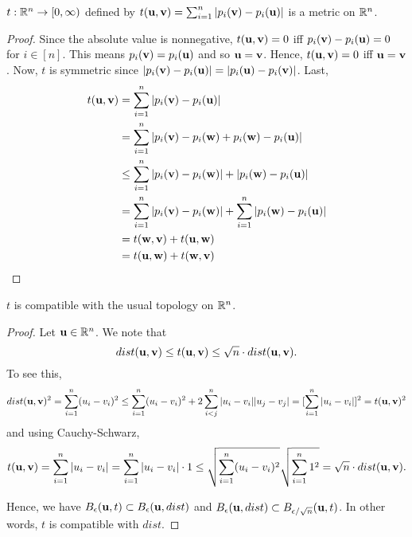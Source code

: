 \documentclass[letterpaper, twoside, 12pt]{book}
\begin{document}
\begin{example}
  \(t:\mathbb R^n\to[0,\infty)\) defined by
  \(t(\mathbf u,\mathbf v)=\sum_{i=1}^n |p_i(\mathbf v)-p_i(\mathbf u)|\)
  is a metric on \(\mathbb R^n\).
\end{example}

\begin{proof}
    Since the absolute value is nonnegative, \(t(\mathbf u, \mathbf v) = 0\) iff \(p_i(\mathbf v) - p_i(\mathbf u) = 0\)
    for \(i \in [n]\). This means \(p_i(\mathbf v) = p_i(\mathbf u)\) and so \(\mathbf u = \mathbf v\).
    Hence, \(t(\mathbf u, \mathbf v) = 0\) iff \(\mathbf u = \mathbf v\). Now, \(t\) is symmetric
    since \(|p_i(\mathbf v) - p_i(\mathbf u)| = |p_i(\mathbf u) - p_i(\mathbf v)|\). Last,
    \begin{align*}
        t(\mathbf u, \mathbf v) &= \sum_{i = 1}^n |p_i(\mathbf v) - p_i(\mathbf u)| \\
                            &= \sum_{i = 1}^n |p_i(\mathbf v) - p_i(\mathbf w) + p_i(\mathbf w) - p_i(\mathbf u)| \\
                            &\leq \sum_{i = 1}^n |p_i(\mathbf v) - p_i(\mathbf w)| + |p_i(\mathbf w) - p_i(\mathbf u)| \\
                            &= \sum_{i = 1}^n |p_i(\mathbf v) - p_i(\mathbf w)| + \sum_{i = 1}^n |p_i(\mathbf w) - p_i(\mathbf u)| \\
                            &= t(\mathbf w, \mathbf v) + t(\mathbf u, \mathbf w) \\
                            &= t(\mathbf u, \mathbf w) + t(\mathbf w, \mathbf v) \\
    \end{align*}
\end{proof}

\begin{theorem}
  \(t\) is compatible with the usual topology on \(\mathbb R^n\).
\end{theorem}

\begin{proof}
    Let \(\mathbf u \in \mathbb R^n\). We note that
    \[ dist(\mathbf u, \mathbf v) \leq t(\mathbf u, \mathbf v) \leq \sqrt{n} \cdot dist(\mathbf u, \mathbf v) .\]
    To see this,
    \[ dist(\mathbf u, \mathbf v)^2 = \sum_{i = 1}^n (u_i - v_i)^2 \leq 
        \sum_{i = 1}^n (u_i - v_i)^2 + 2 \sum_{i < j}^n |u_i - v_i||u_j - v_j| = 
        [\sum_{i = 1}^n |u_i - v_i|]^2 = t(\mathbf u, \mathbf v)^2  \]
    and using Cauchy-Schwarz, 
    \[ t(\mathbf u, \mathbf v) = \sum_{i = 1}^n |u_i - v_i| = \sum_{i = 1}^n |u_i - v_i| \cdot 1 
    \leq \sqrt{ \sum_{i = 1}^n (u_i - v_i)^2} \sqrt{\sum_{i = 1}^n 1^2} = \sqrt{n} \cdot dist(\mathbf u, \mathbf v). \]

    Hence, we have \(B_{\epsilon}(\mathbf u, t) \subset B_{\epsilon}(\mathbf u, dist)\) and
    \(B_{\epsilon}(\mathbf u, dist) \subset B_{\epsilon / \sqrt{n}}(\mathbf u, t)\). In other
    words, \(t\) is compatible with \(dist\).
\end{proof}
\end{document}
